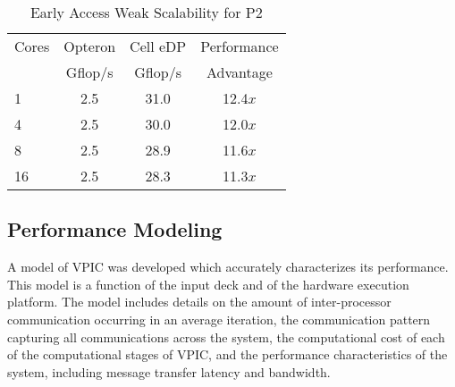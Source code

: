 \documentclass[letter,10pt]{article}
\begin{document}
\begin{table}
\begin{center}
\begin{tabular}{l c c c}
\hline
\hline
Cores & Opteron & Cell eDP & Performance \\
 & Gflop/s & Gflop/s & Advantage \\
\hline
 1  & 2.5 & 31.0 & 12.4$x$ \\
 4  & 2.5 & 30.0 & 12.0$x$ \\
 8  & 2.5 & 28.9 & 11.6$x$ \\
 16 & 2.5 & 28.3 & 11.3$x$ \\
\hline
\end{tabular}
\end{center}
\caption{Early Access Weak Scalability for P2}
\label{tab:weak}
\end{table}

%
%
%
%
%

\subsection{Performance Modeling}

A model of VPIC was developed which accurately characterizes its performance. 
This model is a function of the input deck and of the hardware execution 
platform.  
The model includes 
details on the amount of inter-processor communication occurring in an 
average iteration, the communication pattern capturing all communications 
across the system, the computational cost of each of the computational 
stages of VPIC, and the performance  characteristics of the system, 
including message transfer latency and bandwidth. 
\end{document}
